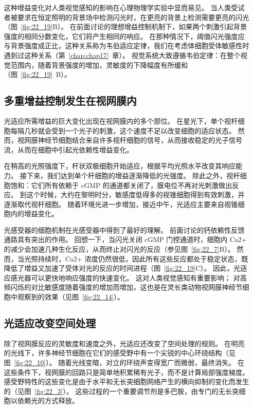 这种增益变化对人类视觉感知的影响在心理物理学实验中显而易见。
当人类受试者被要求在恒定照明的背景场中检测闪光时，在更亮的背景上检测需要更亮的闪光（图~\ref{fig:22_19}B）。
在前面讨论的理想增益控制机制下，如果两个刺激引起背景强度的相同分数变化，它们将产生相同的响应。
在那种情况下，阈值闪光强度应与背景强度成正比，这种关系称为韦伯适应定律，我们在考虑体细胞受体敏感性时遇到过这种关系（第~\ref{chap:chap17}~章）。
视觉系统大致遵循韦伯定律：在整个视觉范围内，随着背景强度的增加，灵敏度的下降幅度有所缓和（图~\ref{fig:22_19}~B）。



\subsection{多重增益控制发生在视网膜内}

光适应所需增益的巨大变化出现在视网膜内的多个部位。 
在星光下，单个视杆细胞每隔几秒就会受到一个光子的刺激，这个速度不足以改变细胞的适应状态。
然而，视网膜神经节细胞结合来自许多视杆细胞的信号，从而接收稳定的光子信号流，从而在细胞中引起光依赖性增益变化。


在稍高的光照强度下，杆状双极细胞开始适应，根据平均光照水平改变其响应能力。
接下来，我们达到单个杆细胞的增益逐渐降低的光强度。 
除此之外，视杆细胞饱和：它们所有依赖于 cGMP 的通道都关闭了，膜电位不再对光刺激做出反应。
到这个时候，大约在黎明时分，敏感度低得多的视锥细胞得到有效刺激，并逐渐取代视杆细胞。
随着环境光进一步增加，接近中午，光适应主要来自视锥细胞内的增益变化。


光感受器的细胞机制在光感受器中得到了最好的理解。
前面讨论的钙依赖性反馈通路具有突出的作用。
回想一下，当闪光关闭 cGMP 门控通道时，细胞内 Ca2+ 的减少会加速几种生化反应，从而终止对闪光的反应（参见图~\ref{fig:22_7}B）。
然而，当光照持续时，Ca2+ 浓度仍然很低，因此所有这些反应都处于稳定状态，既降低了增益又加速了受体对光的反应的时间进程（图~\ref{fig:22_19}C）。
因此，光适应感光器可以更快地响应强度的快速变化。
这对人类视觉感知有重要影响；
对高频闪烁的对比敏感度随着强度的增加而增加，这也是在灵长类动物视网膜神经节细胞中观察到的效果（见图~\ref{fig:22_14}）。



\subsection{光适应改变空间处理}

除了视网膜反应的灵敏度和速度之外，光适应还改变了空间处理的规则。
在明亮的光线下，许多神经节细胞在它们的感受野中有一个尖锐的中心环绕结构（见图~\ref{fig:22_10}）。 
随着光线变暗，对立的环绕声变得宽广而微弱，最终消失。
在这些条件下，视网膜的回路只是简单地积累稀有光子，而不是计算局部强度梯度。
感受野特性的这些变化是由于水平和无长突细胞网络产生的横向抑制的变化而发生的（见图~\ref{fig:22_3}）。
这些过程的一个重要调节剂是多巴胺，由专门的无长突细胞以依赖光的方式释放。


